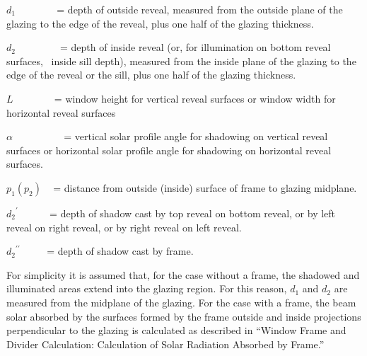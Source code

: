 \({d_1}\) ~~~~~~~ = depth of outside reveal, measured from the outside plane of the glazing to the edge of the reveal, plus one half of the glazing thickness.

\({d_2}\) ~~ ~~~~~ = depth of inside reveal (or, for illumination on bottom reveal surfaces,~ inside sill depth), measured from the inside plane of the glazing to the edge of the reveal or the sill, plus one half of the glazing thickness.

\(L\) ~~~~~~~ = window height for vertical reveal surfaces or window width for horizontal reveal surfaces

\(\alpha\) ~~~~~~~~~ = vertical solar profile angle for shadowing on vertical reveal surfaces or horizontal solar profile angle for shadowing on horizontal reveal surfaces.

\({p_1}({p_2})\) ~ = distance from outside (inside) surface of frame to glazing midplane.

\({d_2}^\prime\) ~~~~~ = depth of shadow cast by top reveal on bottom reveal, or by left reveal on right reveal, or by right reveal on left reveal.

\({d_2}^{\prime \prime }\) ~~~~ = depth of shadow cast by frame.

For simplicity it is assumed that, for the case without a frame, the shadowed and illuminated areas extend into the glazing region. For this reason, \({d_1}\) and \({d_2}\) are measured from the midplane of the glazing. For the case with a frame, the beam solar absorbed by the surfaces formed by the frame outside and inside projections perpendicular to the glazing is calculated as described in ``Window Frame and Divider Calculation: Calculation of Solar Radiation Absorbed by Frame.''

